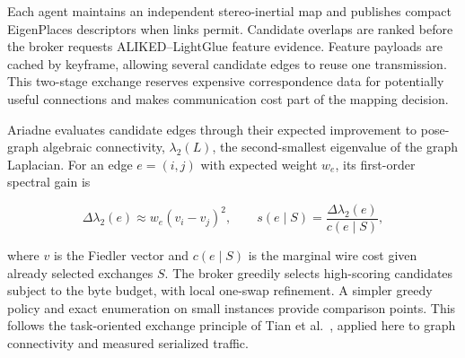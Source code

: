 \documentclass[10pt,a4paper]{article}
\begin{document}
Each agent maintains an independent stereo-inertial map and publishes compact
EigenPlaces descriptors when links permit. Candidate overlaps are ranked before
the broker requests ALIKED--LightGlue feature evidence. Feature payloads are
cached by keyframe, allowing several candidate edges to reuse one transmission.
This two-stage exchange reserves expensive correspondence data for potentially
useful connections and makes communication cost part of the mapping decision.

Ariadne evaluates candidate edges through their expected improvement to
pose-graph algebraic connectivity, $\lambda_2(L)$, the second-smallest
eigenvalue of the graph Laplacian. For an edge $e=(i,j)$ with expected weight
$w_e$, its first-order spectral gain is

\begin{equation}
    \Delta\lambda_2(e)
    \approx w_e(v_i-v_j)^2,
    \qquad
    s(e\mid S)=
    \frac{\Delta\lambda_2(e)}{c(e\mid S)},
    \label{eq:collab-spectral}
\end{equation}

where $v$ is the Fiedler vector and $c(e\mid S)$ is the marginal wire cost
given already selected exchanges $S$. The broker greedily selects high-scoring
candidates subject to the byte budget, with local one-swap refinement. A simpler
greedy policy and exact enumeration on small instances provide comparison
points. This follows the task-oriented exchange principle of Tian et
al.~\cite{tian2018near}, applied here to graph connectivity and measured
serialized traffic.
\end{document}
